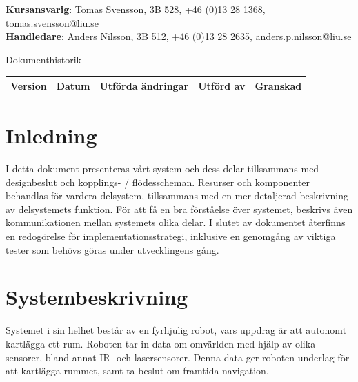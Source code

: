\documentclass{article}
\begin{document}
\begin{center}
\textbf{Kursansvarig}: Tomas Svensson, 3B 528, +46 (0)13 28 1368, tomas.svensson@liu.se \\
\textbf{Handledare}: Anders Nilsson, 3B 512, +46 (0)13 28 2635, anders.p.nilsson@liu.se
\end{center}
\vspace*{\fill}
\clearpage

\renewcommand*\contentsname{Innehållsförteckning}
\tableofcontents
\clearpage


{
\sffamily
\centering
\large


{\huge 
Dokumenthistorik \\
}
\begin{center}
\begin{tabular}{ | c | c | c | c | c |} 
\hline
\textbf{Version} & \textbf{Datum} & \textbf{Utförda ändringar} & \textbf{Utförd av } & \textbf{Granskad} \\  
\hline
\end{tabular}
\end{center}
}

\clearpage


\section{Inledning}
I detta dokument presenteras vårt system och dess delar tillsammans med designbeslut och kopplings- / flödesscheman. Resurser och komponenter behandlas för vardera delsystem,  tillsammans med en mer detaljerad beskrivning av delsystemets funktion. För att få en bra förståelse över systemet, beskrivs även kommunikationen mellan systemets olika delar. I slutet av dokumentet återfinns en redogörelse för implementationsstrategi, inklusive en genomgång av viktiga tester som behövs göras under utvecklingens gång. 

\clearpage

\section{Systembeskrivning}
Systemet i sin helhet består av en fyrhjulig robot, vars uppdrag är att autonomt kartlägga ett rum. Roboten tar in data om omvärlden med hjälp av olika sensorer, bland annat IR- och lasersensorer. Denna data ger roboten underlag för att kartlägga rummet, samt ta beslut om framtida navigation.  
\end{document}
